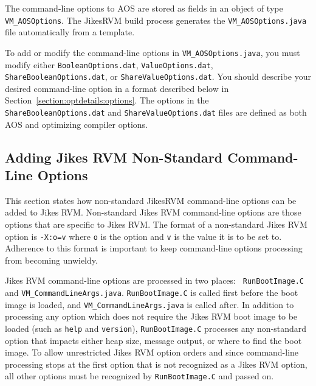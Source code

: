 The command-line options to AOS are
stored as fields in an object of type {\tt VM\_AOSOptions}.
The Jikes\trademark RVM build process generates the {\tt VM\_AOSOptions.java} 
file automatically from a template.  

To add or modify the command-line options in {\tt VM\_AOSOptions.java},
you must modify either {\tt BooleanOptions.dat}, {\tt ValueOptions.dat},
{\tt ShareBooleanOptions.dat}, or {\tt ShareValueOptions.dat}.
You should describe your desired command-line option in a format 
described below in Section~\ref{section:optdetails:options}.
The options in the {\tt ShareBooleanOptions.dat} and {\tt ShareValueOptions.dat}
files are defined as both AOS and optimizing compiler options.

\JikesTMFooter

\subsection{Adding Jikes RVM Non-Standard Command-Line Options}
This section states how non-standard Jikes\trademark RVM command-line options can be added
to Jikes RVM.  
Non-standard Jikes RVM command-line options are those options that are specific
to Jikes RVM.
The format of a non-standard Jikes RVM option is {\tt -X:o=v} where {\tt o} is the 
option and {\tt v} is the value it is to be set to.
Adherence to this format is important to keep command-line options processing
from becoming unwieldy.

Jikes RVM command-line options are processed in two places: {\tt
RunBootImage.C} and 
{\tt VM\_CommandLineArgs.java}.  
{\tt RunBootImage.C} is called first before the boot image is loaded,
and {\tt VM\_CommandLineArgs.java} is called after.
In addition to processing any option which does not require the Jikes
RVM boot image 
to be loaded (such as {\tt help} and {\tt version}), 
{\tt RunBootImage.C} processes any non-standard option that impacts either 
heap size, message output, or where to find the boot image.
To allow unrestricted Jikes RVM option orders and 
since command-line processing stops at the first option that is not 
recognized as a Jikes RVM option, all other options must be recognized by
{\tt RunBootImage.C} and passed on.

\JikesTMFooter
